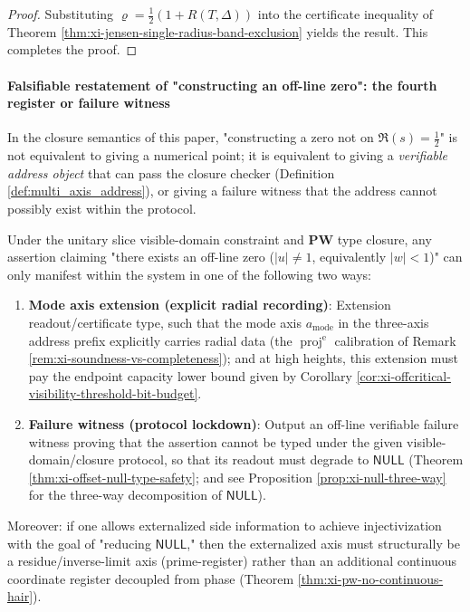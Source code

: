 \begin{proof}
Substituting \(\varrho=\tfrac12(1+R(T,\Delta))\) into the certificate inequality of Theorem \ref{thm:xi-jensen-single-radius-band-exclusion} yields the result. This completes the proof.
\end{proof}

\paragraph{Falsifiable restatement of "constructing an off-line zero": the fourth register or failure witness}
In the closure semantics of this paper, "constructing a zero not on \(\Re(s)=\tfrac12\)" is not equivalent to giving a numerical point;
it is equivalent to giving a \emph{verifiable address object} that can pass the closure checker (Definition \ref{def:multi_axis_address}), or giving a failure witness that the address cannot possibly exist within the protocol.

\begin{proposition}\label{prop:xi-offcritical-falsifiable-restatement}
Under the unitary slice visible-domain constraint and \(\mathbf{PW}\) type closure, any assertion claiming "there exists an off-line zero (\(|u|\neq 1\), equivalently \(|w|<1\))" can only manifest within the system in one of the following two ways:
\begin{enumerate}
  \item \textbf{Mode axis extension (explicit radial recording)}: Extension readout/certificate type, such that the mode axis \(a_{\mathrm{mode}}\) in the three-axis address prefix explicitly carries radial data (the \(\operatorname{proj}^{\mathrm e}\) calibration of Remark \ref{rem:xi-soundness-vs-completeness}); and at high heights, this extension must pay the endpoint capacity lower bound given by Corollary \ref{cor:xi-offcritical-visibility-threshold-bit-budget}.
  \item \textbf{Failure witness (protocol lockdown)}: Output an off-line verifiable failure witness proving that the assertion cannot be typed under the given visible-domain/closure protocol, so that its readout must degrade to \(\mathsf{NULL}\) (Theorem \ref{thm:xi-offset-null-type-safety}; and see Proposition \ref{prop:xi-null-three-way} for the three-way decomposition of \(\mathsf{NULL}\)).
\end{enumerate}
Moreover: if one allows externalized side information to achieve injectivization with the goal of "reducing \(\mathsf{NULL}\)," then the externalized axis must structurally be a residue/inverse-limit axis (prime-register) rather than an additional continuous coordinate register decoupled from phase (Theorem \ref{thm:xi-pw-no-continuous-hair}).
\end{proposition}


